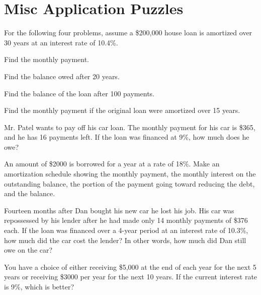 \section{Misc Application Puzzles}

For the following four problems, assume a \$200,000 house loan is amortized over 30 years at an interest rate
of 10.4\%.

\begin{puzzle}
    Find the monthly payment.
\end{puzzle}

\begin{puzzle}
    Find the balance owed after 20 years.
\end{puzzle}

\begin{puzzle}
    Find the balance of the loan after 100 payments.
\end{puzzle}

\begin{puzzle}
    Find the monthly payment if the original loan were amortized over 15 years.
\end{puzzle}

\begin{puzzle}
    Mr. Patel wants to pay off his car loan. The monthly payment for his car is \$365, and he has 16 payments left. If the loan was financed at 9\%, how much does he owe?
\end{puzzle}

\begin{puzzle}
    An amount of \$2000 is borrowed for a year at a rate of 18\%. Make an amortization schedule showing the monthly payment, the monthly interest on the outstanding balance, the portion of the payment going toward reducing the debt, and the balance.
\end{puzzle}

\begin{puzzle}
    Fourteen months after Dan bought his new car he lost his job. His car was repossessed by his lender after he had made only 14 monthly payments of \$376 each. If the loan was financed over a 4-year period at an interest rate of 10.3\%, how much did the car cost the lender? In other words, how much did Dan still owe on the car?
\end{puzzle}

\begin{puzzle}
    You have a choice of either receiving \$5,000 at the end of each year for the next 5 years or receiving \$3000 per year for the next 10 years. If the current interest rate is 9\%, which is better?
\end{puzzle}

